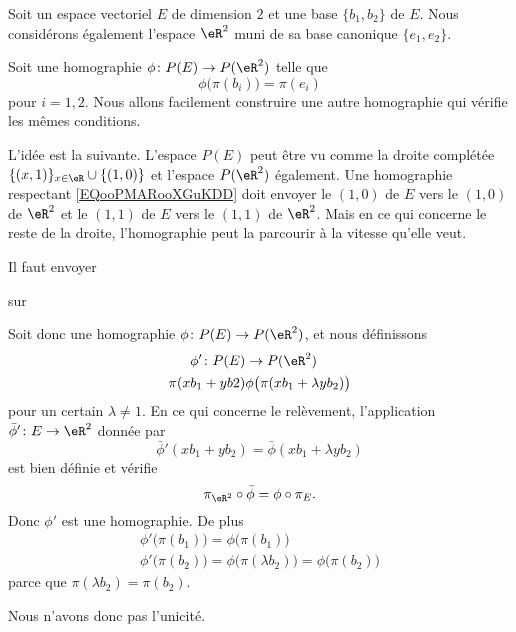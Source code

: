 \begin{example}
	Soit un espace vectoriel \( E\) de dimension \( 2\) et une base \(  \{ b_1,b_2 \}  \) de \( E\). Nous considérons également l'espace \( \eR^2\) muni de sa base canonique \( \{ e_1,e_2 \}\).

	Soit une homographie \( \phi\colon P(E)\to P(\eR^2)\) telle que
	\begin{equation}        \label{EQooPMARooXGuKDD}
		\phi\big( \pi(b_i) \big)=\pi(e_i)
	\end{equation}
	pour \( i=1,2\). Nous allons facilement construire une autre homographie qui vérifie les mêmes conditions.

	L'idée est la suivante. L'espace \( P(E)\) peut être vu comme la droite complétée \( \{ (  x,1   ) \}_{x\in \eR}\cup\{ (1,0) \} \) et l'espace \( P(\eR^2)\) également. Une homographie respectant \eqref{EQooPMARooXGuKDD} doit envoyer le \( (1,0)\) de \( E\) vers le \( (1,0)\) de \( \eR^2\) et le \( (1,1)\) de \( E\) vers le \( (1,1)\) de \( \eR^2\). Mais en ce qui concerne le reste de la droite, l'homographie peut la parcourir à la vitesse qu'elle veut.

	Il faut envoyer

	\begin{center}
		
		sur
		
	\end{center}

	Soit donc une homographie \( \phi\colon P(E)\to P(\eR^2)\), et nous définissons
	\begin{equation}
		\begin{aligned}
			\phi'\colon P(E) & \to P(\eR^2)                           \\
			\pi(xb_1+yb2)    & \phi\big( \pi(xb_1+\lambda yb_2) \big)
		\end{aligned}
	\end{equation}
	pour un certain \( \lambda\neq 1\). En ce qui concerne le relèvement, l'application \( \bar\phi'\colon E\to \eR^2\) donnée par
	\begin{equation}
		\bar\phi'(xb_1+yb_2)=\bar\phi(xb_1+\lambda yb_2)
	\end{equation}
	est bien définie et vérifie
	\begin{equation}
		\pi_{\eR^2}\circ\bar\phi=\phi\circ\pi_E.
	\end{equation}
	Donc \( \phi'\) est une homographie. De plus
	\begin{subequations}
		\begin{align}
			\phi'\big( \pi(b_1) \big)=\phi\big( \pi(b_1) \big) \\
			\phi'\big( \pi(b_2) \big)=\phi\big( \pi(\lambda b_2) \big)=\phi\big( \pi(b_2) \big)
		\end{align}
	\end{subequations}
	parce que \( \pi(\lambda b_2)=\pi(b_2)\).

	Nous n'avons donc pas l'unicité.
\end{example}

